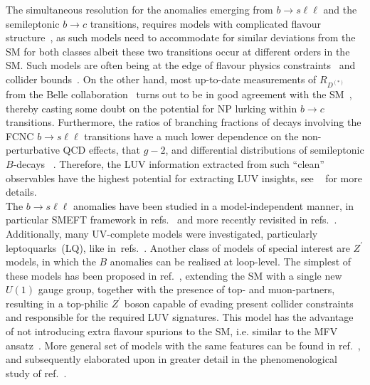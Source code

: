 The simultaneous resolution for the anomalies emerging from $ b \to s \ell \ell$ and the semileptonic $b \to c$ transitions, requires models with complicated flavour structure~\cite{DiLuzio:2017vat,Calibbi:2017qbu,Bordone:2017bld,Barbieri:2017tuq,Assad:2017iib,Heeck:2018ntp,Fornal:2018dqn,Crivellin:2018yvo,Crivellin:2019dwb,Bordone:2019uzc}, as such models need to accommodate for similar deviations from the SM for both classes albeit these two transitions occur at different orders in the SM. Such models are often being at the edge of flavour physics constraints~\cite{Bona:2007vi,Silvestrini:2018dos} and collider bounds~\cite{Greljo:2017vvb,Baker:2019sli}.
On the other hand, most up-to-date measurements of $R_{D^{(*)}}$ from the Belle collaboration~\cite{Hirose:2016wfn,Abdesselam:2019dgh} turns out to be in good agreement with the SM~\cite{Bigi:2016mdz,Bernlochner:2017jka,Bigi:2017jbd,Jaiswal:2017rve}, thereby casting some doubt on the potential for NP lurking within $b\to c$ transitions. 
Furthermore, the ratios of branching fractions of decays involving the FCNC $b \to s \ell \ell$ transitions have a much lower dependence on the  non-perturbative QCD effects, that $g-2$, and differential distributions of semileptonic $B$-decays~\cite{Capdevila:2016ivx,Serra:2016ivr,Wehle:2016yoi,Alguero:2019pjc} . Therefore, the LUV information extracted from such ``clean'' observables have the highest potential for extracting LUV insights, see ~\cite{Kou:2018nap} for more details.\\
The  $ b \to s \ell \ell$ anomalies have been studied in a model-independent manner, in particular SMEFT framework in refs.~\cite{DAmico:2017mtc,Geng:2017svp,Capdevila:2017bsm,Ciuchini:2017mik,Hiller:2017bzc} and more recently revisited in refs.~\cite{Ciuchini:2019usw,Aebischer:2019mlg,Alok:2019ufo,Alguero:2019ptt,Kowalska:2019ley,Arbey:2019duh,Datta:2019zca}.  Additionally, many UV-complete models were investigated, particularly leptoquarks~(LQ), like in~refs.~\cite{Calibbi:2015kma,Dorsner:2016wpm,Buttazzo:2017ixm,Kumar:2018kmr,Cornella:2019hct}. Another class of models of special interest are $Z^\prime$ models, in which the $B$ anomalies can be realised at loop-level. The simplest of these models has been proposed in ref.~\cite{Kamenik:2017tnu}, extending the SM with a single new $U(1)$ gauge group, together with the presence of top- and muon-partners, resulting in a top-philic $Z^\prime$ boson capable of evading present collider constraints~\cite{Fox:2018ldq} and responsible for the required LUV signatures. This model has the advantage of not introducing extra flavour spurions to the SM, i.e. similar to the MFV ansatz~\cite{Buras:2000dm,DAmbrosio:2002vsn,Kagan:2009bn}.  More general set of models with the same features can be found  in ref.~\cite{Celis:2017doq},  and subsequently elaborated upon in greater detail in the phenomenological study of ref.~\cite{Camargo-Molina:2018cwu}. \\
